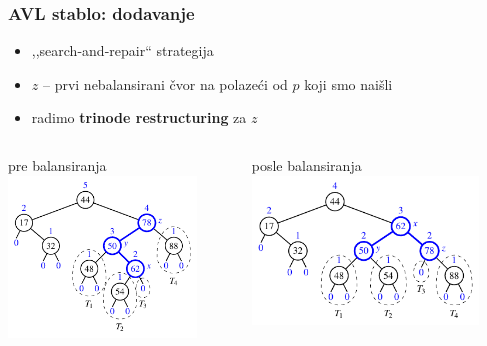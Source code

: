 \documentclass[compress]{beamer}
\begin{document}
\begin{frame}[fragile]
  \frametitle{AVL stablo: dodavanje}
  \begin{itemize}
    \item ,,search-and-repair`` strategija
    \item $z$ -- prvi nebalansirani čvor na polazeći od $p$ koji smo naišli
    \item radimo \textbf{trinode restructuring} za $z$ 
  \end{itemize}
  \begin{columns}
    \begin{column}[t]{6cm}
      \begin{center}
        pre balansiranja 
        \includegraphics[width=5cm]{asp-11-pic15a.pdf}
      \end{center}
    \end{column}  
    \begin{column}[t]{6cm}
      \begin{center}
        posle balansiranja
        \includegraphics[width=6cm]{asp-11-pic15b.pdf}
      \end{center}
    \end{column}  
  \end{columns}
\end{frame}
\end{document}
